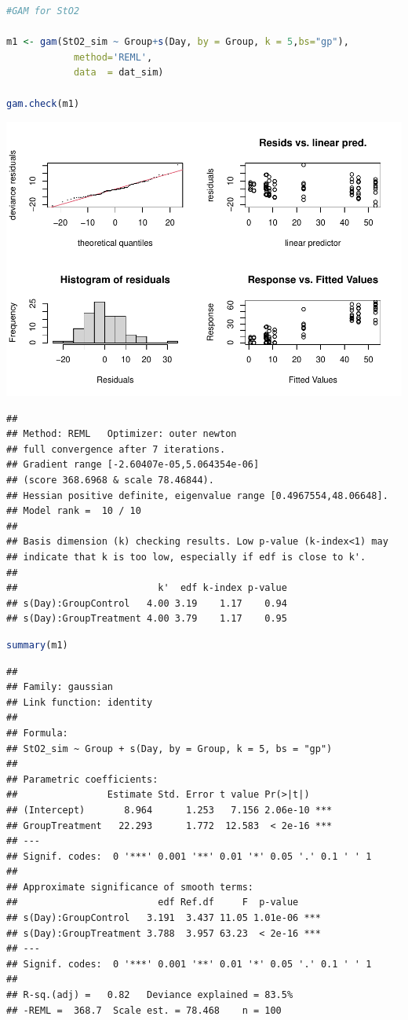 \documentclass[
]{article}
\begin{document}
\begin{lstlisting}[language=R]
#GAM for StO2

m1 <- gam(StO2_sim ~ Group+s(Day, by = Group, k = 5,bs="gp"),
            method='REML',
            data  = dat_sim)

gam.check(m1)
\end{lstlisting}

\includegraphics{Full_document_files/figure-latex/final-model-Appendix-1}

\begin{lstlisting}
## 
## Method: REML   Optimizer: outer newton
## full convergence after 7 iterations.
## Gradient range [-2.60407e-05,5.064354e-06]
## (score 368.6968 & scale 78.46844).
## Hessian positive definite, eigenvalue range [0.4967554,48.06648].
## Model rank =  10 / 10 
## 
## Basis dimension (k) checking results. Low p-value (k-index<1) may
## indicate that k is too low, especially if edf is close to k'.
## 
##                         k'  edf k-index p-value
## s(Day):GroupControl   4.00 3.19    1.17    0.94
## s(Day):GroupTreatment 4.00 3.79    1.17    0.95
\end{lstlisting}

\begin{lstlisting}[language=R]
summary(m1)
\end{lstlisting}

\begin{lstlisting}
## 
## Family: gaussian 
## Link function: identity 
## 
## Formula:
## StO2_sim ~ Group + s(Day, by = Group, k = 5, bs = "gp")
## 
## Parametric coefficients:
##                Estimate Std. Error t value Pr(>|t|)    
## (Intercept)       8.964      1.253   7.156 2.06e-10 ***
## GroupTreatment   22.293      1.772  12.583  < 2e-16 ***
## ---
## Signif. codes:  0 '***' 0.001 '**' 0.01 '*' 0.05 '.' 0.1 ' ' 1
## 
## Approximate significance of smooth terms:
##                         edf Ref.df     F  p-value    
## s(Day):GroupControl   3.191  3.437 11.05 1.01e-06 ***
## s(Day):GroupTreatment 3.788  3.957 63.23  < 2e-16 ***
## ---
## Signif. codes:  0 '***' 0.001 '**' 0.01 '*' 0.05 '.' 0.1 ' ' 1
## 
## R-sq.(adj) =   0.82   Deviance explained = 83.5%
## -REML =  368.7  Scale est. = 78.468    n = 100
\end{lstlisting}
\end{document}
